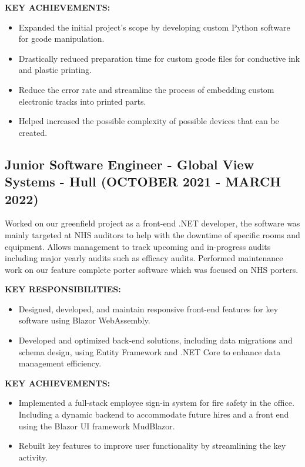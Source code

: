 \documentclass{article}
\begin{document}
\begin{minipage}[t]{1\textwidth}
    \footnotesize{\textbf{KEY ACHIEVEMENTS:}}
    \normalsize{}
    \begin{itemize}[leftmargin=*]
        \item Expanded the initial project’s scope by developing custom Python software for gcode manipulation.
        \item Drastically reduced preparation time for custom gcode files for conductive ink and plastic printing.
        \item Reduce the error rate and streamline the process of embedding custom electronic tracks into printed parts. 
        \item Helped increased the possible complexity of possible devices that can be created.  
    \end{itemize}
\end{minipage}

\subsection{Junior Software Engineer - \textnormal{Global View Systems - Hull} \footnotesize{(OCTOBER 2021 - MARCH 2022)}}
\noindent
Worked on our greenfield project as a front-end .NET developer, the software was mainly targeted at NHS auditors to help with the downtime of specific rooms and equipment. Allows management to track upcoming and in-progress audits including major yearly audits such as efficacy audits. Performed maintenance work on our feature complete porter software which was focused on NHS porters.
\vspace{0.5em}
\newline
\begin{minipage}[t]{1\textwidth}
    \footnotesize{\textbf{KEY RESPONSIBILITIES:}}
    \normalsize{}
    \begin{itemize}[leftmargin=*]
        \item Designed, developed, and maintain responsive front-end features for key software using Blazor WebAssembly.
        \item Developed and optimized back-end solutions, including data migrations and schema design, using Entity Framework and .NET Core to enhance data management efficiency.
    \end{itemize}
\end{minipage}
\hfill

\vspace{0.1em}
\begin{minipage}[t]{1\textwidth}
    \footnotesize{\textbf{KEY ACHIEVEMENTS:}}
    \normalsize{}
    \begin{itemize}[leftmargin=*]
        \item Implemented a full-stack employee sign-in system for fire safety in the office. Including a dynamic backend to accommodate future hires and a front end using the Blazor UI framework MudBlazor.
        \item Rebuilt key features to improve user functionality by streamlining the key activity. 
    \end{itemize}
\end{minipage}
\end{document}
